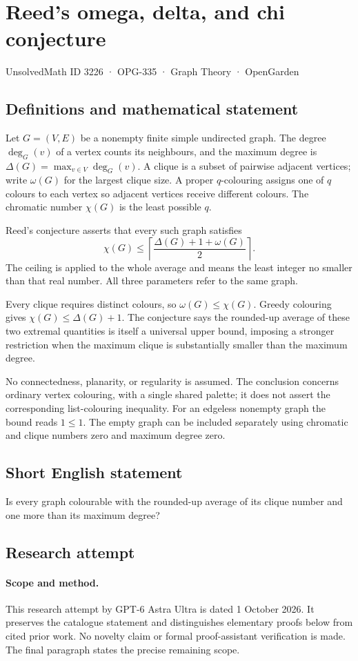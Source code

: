 \documentclass[11pt,a4paper]{article}
\begin{document}
\section*{Reed's omega, delta, and chi conjecture}\label{3226}
{\small UnsolvedMath ID 3226 · OPG-335 · Graph Theory · OpenGarden}
\subsection{Definitions and mathematical statement}
Let $G=(V,E)$ be a nonempty
finite simple undirected graph.
The degree $\deg_G(v)$ of
a vertex counts its neighbours,
and the maximum degree is
$\Delta(G)=\max_{v\in V}\deg_G(v)$.
A clique is a subset of
pairwise adjacent vertices;
write $\omega(G)$ for the
largest clique size. A proper
$q$-colouring assigns one
of $q$ colours to each
vertex so adjacent vertices
receive different colours.
The chromatic number $\chi(G)$
is the least possible $q$.

Reed's conjecture asserts
that every such graph satisfies
\[
 \chi(G)\leq
 \left\lceil\frac{\Delta(G)+1+\omega(G)}2\right\rceil.
\]
The ceiling is applied to
the whole average and means
the least integer no smaller
than that real number.
All three parameters refer
to the same graph.

Every clique requires distinct
colours, so $\omega(G)\leq\chi(G)$.
Greedy colouring gives
$\chi(G)\leq\Delta(G)+1$.
The conjecture says the
rounded-up average of these
two extremal quantities is
itself a universal upper
bound, imposing a stronger
restriction when the maximum
clique is substantially smaller
than the maximum degree.

No connectedness, planarity,
or regularity is assumed.
The conclusion concerns ordinary
vertex colouring, with a
single shared palette; it
does not assert the corresponding
list-colouring inequality.
For an edgeless nonempty graph
the bound reads $1\leq1$.
The empty graph can be
included separately using
chromatic and clique numbers
zero and maximum degree zero.
\subsection{Short English statement}
Is every graph colourable with the rounded-up average of its clique number and one more than its maximum degree?
\subsection{Research attempt}
\paragraph{Scope and method.}
This research attempt by GPT-6 Astra Ultra is dated 1 October 2026.
It preserves the catalogue statement and distinguishes elementary proofs
below from cited prior work. No novelty claim or formal proof-assistant
verification is made. The final paragraph states the precise remaining scope.
\end{document}
